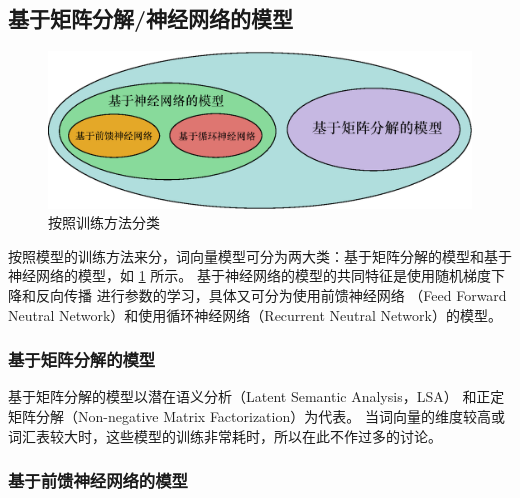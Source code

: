 \subsection{基于矩阵分解/神经网络的模型}
\begin{figure}
  \includegraphics[width=\textwidth]{figures/train-venn.eps}
  \centering
  \caption{按照训练方法分类}
  \label{fig:train-venn}
\end{figure}

按照模型的训练方法来分，词向量模型可分为两大类：基于矩阵分解的模型和基于神经网络的模型，如 \cref{fig:train-venn} 所示。
基于神经网络的模型的共同特征是使用随机梯度下降和反向传播
\cite{Rumelhart:1988:LRB:65669.104451}进行参数的学习，具体又可分为使用前馈神经网络
（Feed Forward Neutral Network）和使用循环神经网络（Recurrent Neutral Network）的模型。

\subsubsection{基于矩阵分解的模型}
基于矩阵分解的模型以潜在语义分析（Latent Semantic Analysis，LSA）
\cite{DBLP:journals/jasis/DeerwesterDLFH90}和正定矩阵分解（Non-negative Matrix Factorization）为代表。
当词向量的维度较高或词汇表较大时，这些模型的训练非常耗时，所以在此不作过多的讨论。

\subsubsection{基于前馈神经网络的模型}

